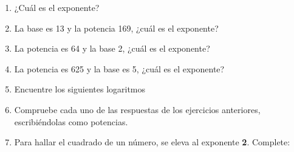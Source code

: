 \documentclass[10pt,twoside]{article}
\begin{document}
\begin{enumerate}
\begin{enumerate}
\end{enumerate}
\item ¿Cuál es el exponente?
\begin{enumerate}
\end{enumerate}
\item La base es 13 y la potencia 169, ¿cuál es el exponente?
\item La potencia es 64 y la base 2, ¿cuál es el exponente?
\item La potencia es 625 y la base es 5, ¿cuál es el exponente?
\item Encuentre los siguientes logaritmos
\begin{enumerate}
\end{enumerate}
\item Compruebe cada uno de las respuestas de los ejercicios anteriores, escribiéndolas como potencias.
\item Para hallar el cuadrado de un número, se eleva al exponente \textbf{2}. Complete:


\end{enumerate}
\end{document}
